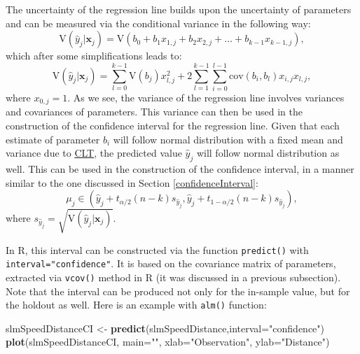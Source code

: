 \documentclass[
]{book}
\newenvironment{Shaded}{\begin{snugshade}}{\end{snugshade}}
\newcommand{\AttributeTok}[1]{\textcolor[rgb]{0.13,0.29,0.53}{#1}}
\newcommand{\FunctionTok}[1]{\textcolor[rgb]{0.13,0.29,0.53}{\textbf{#1}}}
\newcommand{\NormalTok}[1]{#1}
\newcommand{\OtherTok}[1]{\textcolor[rgb]{0.56,0.35,0.01}{#1}}
\newcommand{\StringTok}[1]{\textcolor[rgb]{0.31,0.60,0.02}{#1}}
\theoremstyle{definition}
\theoremstyle{definition}
\theoremstyle{definition}
\theoremstyle{definition}
\theoremstyle{remark}
\begin{document}
The uncertainty of the regression line builds upon the uncertainty of parameters and can be measured via the conditional variance in the following way:
\begin{equation}
    \mathrm{V}(\hat{y}_j| \mathbf{x}_j) = \mathrm{V}(b_0 + b_1 x_{1,j} + b_2 x_{2,j} + \dots + b_{k-1} x_{k-1,j}) ,
    \label{eq:regressionLineUncertaintyVariance01}
\end{equation}
which after some simplifications leads to:
\begin{equation}
    \mathrm{V}(\hat{y}_j| \mathbf{x}_j) = \sum_{l=0}^{k-1} \mathrm{V}(b_j) x^2_{l,j} + 2 \sum_{l=1}^{k-1} \sum_{i=0}^{l-1}  \mathrm{cov}(b_i,b_l) x_{i,j} x_{l,j} ,
    \label{eq:regressionLineUncertaintyVariance02}
\end{equation}
where \(x_{0,j}=1\). As we see, the variance of the regression line involves variances and covariances of parameters. This variance can then be used in the construction of the confidence interval for the regression line. Given that each estimate of parameter \(b_i\) will follow normal distribution with a fixed mean and variance due to \hyperref[CLT]{CLT}, the predicted value \(\hat{y}_j\) will follow normal distribution as well. This can be used in the construction of the confidence interval, in a manner similar to the one discussed in Section \ref{confidenceInterval}:
\begin{equation}
    \mu_j \in (\hat{y}_j + t_{\alpha/2}(n-k) s_{\hat{y}_j}, \hat{y}_j + t_{1-\alpha/2}(n-k) s_{\hat{y}_j}),
    \label{eq:confidenceIntervalRegression}
\end{equation}
where \(s_{\hat{y}_j}=\sqrt{\mathrm{V}(\hat{y}_j| \mathbf{x}_j)}\).

In R, this interval can be constructed via the function \texttt{predict()} with \texttt{interval="confidence"}. It is based on the covariance matrix of parameters, extracted via \texttt{vcov()} method in R (it was discussed in a previous subsection). Note that the interval can be produced not only for the in-sample value, but for the holdout as well. Here is an example with \texttt{alm()} function:

\begin{Shaded}
\begin{Highlighting}[]
\NormalTok{slmSpeedDistanceCI }\OtherTok{\textless{}{-}} \FunctionTok{predict}\NormalTok{(slmSpeedDistance,}\AttributeTok{interval=}\StringTok{"confidence"}\NormalTok{)}
\FunctionTok{plot}\NormalTok{(slmSpeedDistanceCI, }\AttributeTok{main=}\StringTok{""}\NormalTok{,}
     \AttributeTok{xlab=}\StringTok{"Observation"}\NormalTok{, }\AttributeTok{ylab=}\StringTok{"Distance"}\NormalTok{)}
\end{Highlighting}
\end{Shaded}
\end{document}
